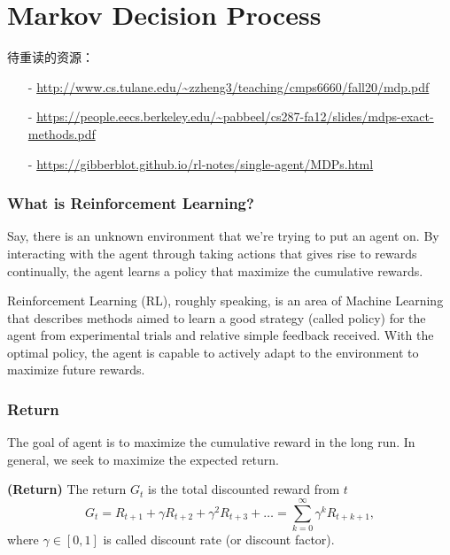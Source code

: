 
\chapter{Markov Decision Process}


待重读的资源：
\begin{itemize}
\setlength{\parskip}{0pt}
\item[-]
\url{http://www.cs.tulane.edu/~zzheng3/teaching/cmps6660/fall20/mdp.pdf}

\item[-]
\url{https://people.eecs.berkeley.edu/~pabbeel/cs287-fa12/slides/mdps-exact-methods.pdf}

\item[-]
\url{https://gibberblot.github.io/rl-notes/single-agent/MDPs.html}
\end{itemize}


\subsection{What is Reinforcement Learning?}

Say, there is an unknown environment that we're trying to put an agent on. By 
interacting with the agent through taking actions that gives rise to rewards 
continually, the agent learns a policy that maximize the cumulative rewards.

Reinforcement Learning (RL), roughly speaking, is an area of Machine Learning 
that describes methods aimed to learn a good strategy (called policy) for the 
agent from experimental trials and relative simple feedback received. With the 
optimal policy, the agent is capable to actively adapt to the environment to
maximize future rewards.

\subsection{Return}

The goal of agent is to maximize the cumulative reward in the long run. In 
general, we seek to maximize the expected return.

\begin{definition} {\rm\bf (Return)}
The return $G_t$ is the total discounted reward from $t$
\begin{equation}
G_t=R_{t+1}+\gamma R_{t+2}+\gamma^2 R_{t+3}+\dots=\sum_{k=0}^{\infty}\gamma^k R_{t+k+1},
\end{equation}
where $\gamma\in[0,1]$ is called discount rate (or discount factor).
\end{definition}

